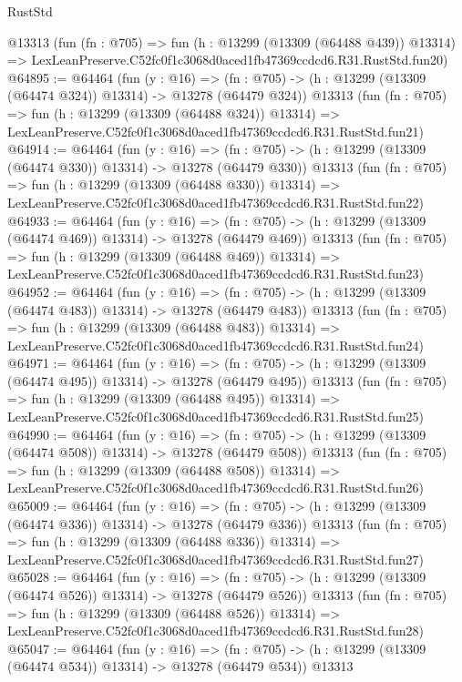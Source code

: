 \begin{lexlean}{RustStd}
\begin{coremodule}
    @13313
    (fun (fn : @705) =>
    fun (h : @13299 (@13309 (@64488 @439)) @13314) =>
    LexLeanPreserve.C52fc0f1c3068d0aced1fb47369ccdcd6.R31.RustStd.fun20)
@64895 := @64464
    (fun (y : @16) =>
    (fn : @705) -> (h : @13299 (@13309 (@64474 @324)) @13314) -> @13278 (@64479 @324))
    @13313
    (fun (fn : @705) =>
    fun (h : @13299 (@13309 (@64488 @324)) @13314) =>
    LexLeanPreserve.C52fc0f1c3068d0aced1fb47369ccdcd6.R31.RustStd.fun21)
@64914 := @64464
    (fun (y : @16) =>
    (fn : @705) -> (h : @13299 (@13309 (@64474 @330)) @13314) -> @13278 (@64479 @330))
    @13313
    (fun (fn : @705) =>
    fun (h : @13299 (@13309 (@64488 @330)) @13314) =>
    LexLeanPreserve.C52fc0f1c3068d0aced1fb47369ccdcd6.R31.RustStd.fun22)
@64933 := @64464
    (fun (y : @16) =>
    (fn : @705) -> (h : @13299 (@13309 (@64474 @469)) @13314) -> @13278 (@64479 @469))
    @13313
    (fun (fn : @705) =>
    fun (h : @13299 (@13309 (@64488 @469)) @13314) =>
    LexLeanPreserve.C52fc0f1c3068d0aced1fb47369ccdcd6.R31.RustStd.fun23)
@64952 := @64464
    (fun (y : @16) =>
    (fn : @705) -> (h : @13299 (@13309 (@64474 @483)) @13314) -> @13278 (@64479 @483))
    @13313
    (fun (fn : @705) =>
    fun (h : @13299 (@13309 (@64488 @483)) @13314) =>
    LexLeanPreserve.C52fc0f1c3068d0aced1fb47369ccdcd6.R31.RustStd.fun24)
@64971 := @64464
    (fun (y : @16) =>
    (fn : @705) -> (h : @13299 (@13309 (@64474 @495)) @13314) -> @13278 (@64479 @495))
    @13313
    (fun (fn : @705) =>
    fun (h : @13299 (@13309 (@64488 @495)) @13314) =>
    LexLeanPreserve.C52fc0f1c3068d0aced1fb47369ccdcd6.R31.RustStd.fun25)
@64990 := @64464
    (fun (y : @16) =>
    (fn : @705) -> (h : @13299 (@13309 (@64474 @508)) @13314) -> @13278 (@64479 @508))
    @13313
    (fun (fn : @705) =>
    fun (h : @13299 (@13309 (@64488 @508)) @13314) =>
    LexLeanPreserve.C52fc0f1c3068d0aced1fb47369ccdcd6.R31.RustStd.fun26)
@65009 := @64464
    (fun (y : @16) =>
    (fn : @705) -> (h : @13299 (@13309 (@64474 @336)) @13314) -> @13278 (@64479 @336))
    @13313
    (fun (fn : @705) =>
    fun (h : @13299 (@13309 (@64488 @336)) @13314) =>
    LexLeanPreserve.C52fc0f1c3068d0aced1fb47369ccdcd6.R31.RustStd.fun27)
@65028 := @64464
    (fun (y : @16) =>
    (fn : @705) -> (h : @13299 (@13309 (@64474 @526)) @13314) -> @13278 (@64479 @526))
    @13313
    (fun (fn : @705) =>
    fun (h : @13299 (@13309 (@64488 @526)) @13314) =>
    LexLeanPreserve.C52fc0f1c3068d0aced1fb47369ccdcd6.R31.RustStd.fun28)
@65047 := @64464
    (fun (y : @16) =>
    (fn : @705) -> (h : @13299 (@13309 (@64474 @534)) @13314) -> @13278 (@64479 @534))
    @13313

\end{coremodule}
\end{lexlean}
